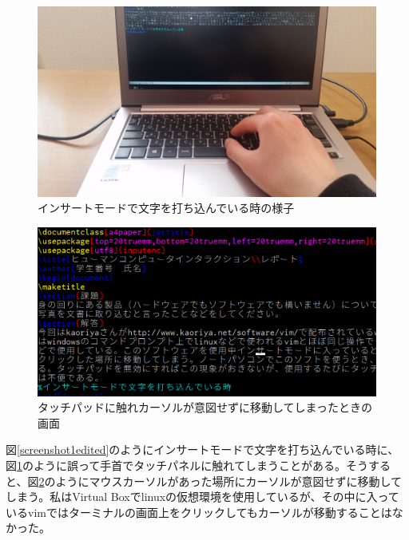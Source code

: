 \documentclass[a4paper]{jarticle}
\begin{document}
\begin{figure}[H]
	\begin{center}
		\includegraphics[width=15cm]{picture1.jpg}
		\caption{インサートモードで文字を打ち込んでいる時の様子}
		\label{picture1}
	\end{center}
\end{figure}

\begin{figure}[H]
	\begin{center}
		\includegraphics[width=15cm]{screenshot2edited.png}
		\caption{タッチパッドに触れカーソルが意図せずに移動してしまったときの画面}
		\label{screenshot2edited}
	\end{center}
\end{figure}
図\ref{screenshot1edited}のようにインサートモードで文字を打ち込んでいる時に、図\ref{picture1}のように誤って手首でタッチパネルに触れてしまうことがある。そうすると、図\ref{screenshot2edited}のようにマウスカーソルがあった場所にカーソルが意図せずに移動してしまう。私はVirtual Boxでlinuxの仮想環境を使用しているが、その中に入っているvimではターミナルの画面上をクリックしてもカーソルが移動することはなかった。
\end{document}

